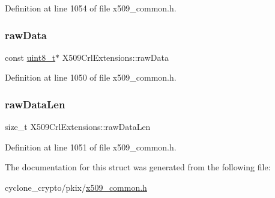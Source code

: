 Definition at line 1054 of file x509\+\_\+common.\+h.

\mbox{\label{structX509CrlExtensions_a521e89220625fa3e60676d3e47e562fd}} 
\subsubsection{\texorpdfstring{raw\+Data}{rawData}}
{\footnotesize\ttfamily const \hyperlink{stdint_8h_aba7bc1797add20fe3efdf37ced1182c5}{uint8\+\_\+t}$\ast$ X509\+Crl\+Extensions\+::raw\+Data}



Definition at line 1050 of file x509\+\_\+common.\+h.

\mbox{\label{structX509CrlExtensions_ae998f5bcf83a5ef274ff191bbefd20c8}} 
\subsubsection{\texorpdfstring{raw\+Data\+Len}{rawDataLen}}
{\footnotesize\ttfamily size\+\_\+t X509\+Crl\+Extensions\+::raw\+Data\+Len}



Definition at line 1051 of file x509\+\_\+common.\+h.



The documentation for this struct was generated from the following file\+:\begin{DoxyCompactItemize}
\item 
cyclone\+\_\+crypto/pkix/\hyperlink{pkix_2x509__common_8h}{x509\+\_\+common.\+h}\end{DoxyCompactItemize}
